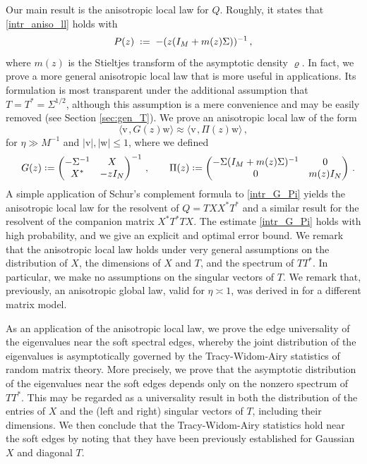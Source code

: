 \documentclass[11pt]{article} %
\numberwithin{equation}{section}
\numberwithin{figure}{section}
\theoremstyle{plain} %
\theoremstyle{definition} %
\newcommand{\f}[1]{\boldsymbol{\mathrm{#1}}} %
\newcommand*{\deq}{\mathrel{\vcenter{\baselineskip0.65ex \lineskiplimit0pt \hbox{.}\hbox{.}}}=}
\renewcommand{\leq}{\leqslant}
\newcommand{\abs}[1]{\lvert #1 \rvert}
\newcommand{\scalar}[2]{\langle{#1} \mspace{2mu}, {#2}\rangle}
\begin{document}
Our main result is the anisotropic local law for $Q$. Roughly, it states that \eqref{intr_aniso_ll} holds with
\begin{equation*}
P(z) \;\deq\; - (z (I_M + m(z) \Sigma))^{-1}\,,
\end{equation*}
where $m(z)$ is the Stieltjes transform of the asymptotic density $\varrho$. In fact, we prove a more general anisotropic local law that is more useful in applications. Its formulation is most transparent under the additional assumption that $T = T^* = \Sigma^{1/2}$, although this assumption is a mere convenience and may be easily removed (see Section \ref{sec:gen_T}). We prove an anisotropic local law of the form
\begin{equation} \label{intr_G_Pi}
\scalar{\f v}{G(z) \f w} \approx \scalar{\f v}{\Pi(z) \f w}\,,
\end{equation}
for $\eta \gg M^{-1}$ and $\abs{\f v}, \abs{\f w} \leq 1$, where we defined
\begin{equation*}
\quad G(z) \deq \begin{pmatrix}
-\Sigma^{-1} & X
\\
X^* & -zI_N
\end{pmatrix}^{-1}\,, \qquad
\Pi(z) \deq \begin{pmatrix}
-\Sigma(I_M + m(z) \Sigma)^{-1} & 0
\\
0 & m(z) I_N
\end{pmatrix}\,.
\end{equation*}
A simple application of Schur's complement formula to \eqref{intr_G_Pi} yields the anisotropic local law for the resolvent of $Q = TXX^*T^*$ and a similar result for the resolvent of the companion matrix $X^* T^* T X$. The estimate \eqref{intr_G_Pi} holds with high probability, and we give an explicit and optimal error bound. We remark that the anisotropic local law holds under very general assumptions on the distribution of $X$, the dimensions of $X$ and $T$, and the spectrum of $T T^*$. In particular, we make no assumptions on the singular vectors of $T$. We remark that, previously, an anisotropic global law, valid for $\eta \asymp 1$, was derived in \cite{HLNP} for a different matrix model.

As an application of the anisotropic local law, we prove the edge universality of the eigenvalues near the soft spectral edges, whereby the joint distribution of the eigenvalues is asymptotically governed by the Tracy-Widom-Airy statistics of random matrix theory. More precisely, we prove that the asymptotic distribution of the eigenvalues near the soft edges depends only on the nonzero spectrum of $T T^*$. This may be regarded as a universality result in both the distribution of the entries of $X$ and the (left and right) singular vectors of $T$, including their dimensions. We then conclude that the Tracy-Widom-Airy statistics hold near the soft edges by noting that they have been previously established \cite{HHN, ElK2, Ona, SL} for Gaussian $X$ and diagonal $T$.
\end{document}
